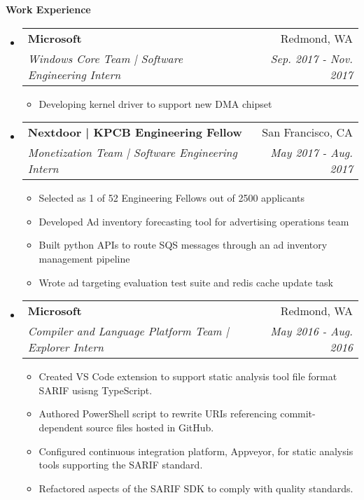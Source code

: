 \documentclass[letterpaper,10pt]{article}
\makeatletter
\newcommand{\resitem}[1]{\item #1 \vspace{-2pt}}
\newcommand{\resheading}[1]{{\large \colorbox{mygrey}{\begin{minipage}{\textwidth}{\textbf{#1 \vphantom{p\^{E}}}}\end{minipage}}}}
\newcommand{\ressubheading}[4]{
\begin{tabular*}{7.0in}{l@{\extracolsep{\fill}}r}
		\textbf{#1} & #2 \\
		\textit{#3} & \textit{#4} \\
\end{tabular*}\vspace{-6pt}}
\makeatother
\begin{document}
\resheading{Work Experience}
\begin{itemize}
\item
	\ressubheading{Microsoft}{Redmond, WA}{Windows Core Team | Software Engineering Intern}{Sep. 2017 - Nov. 2017}
	\begin{itemize}
		\resitem{Developing kernel driver to support new DMA chipset}
	\end{itemize}
\item
	\ressubheading{Nextdoor | KPCB Engineering Fellow}{San Francisco, CA}{Monetization Team | Software Engineering Intern}{May 2017 - Aug. 2017}
	\begin{itemize}
		\resitem{Selected as 1 of 52 Engineering Fellows out of 2500 applicants}
		\resitem{Developed Ad inventory forecasting tool for advertising operations team}
		\resitem{Built python APIs to route SQS messages through an ad inventory management pipeline}
		\resitem{Wrote ad targeting evaluation test suite and redis cache update task}
	\end{itemize}
\item
	\ressubheading{Microsoft}{Redmond, WA}{Compiler and Language Platform Team | Explorer Intern}{May 2016 - Aug. 2016}
	\begin{itemize}
		\resitem{Created VS Code extension to support static analysis tool file format SARIF usisng TypeScript.}
	  \resitem{Authored PowerShell script to rewrite URIs referencing commit-dependent source files hosted in GitHub.}
		\resitem{Configured continuous integration platform, Appveyor, for static analysis tools supporting the SARIF standard.}
		\resitem{Refactored aspects of the SARIF SDK to comply with quality standards.}
	\end{itemize}
\end{itemize}
\end{document}
